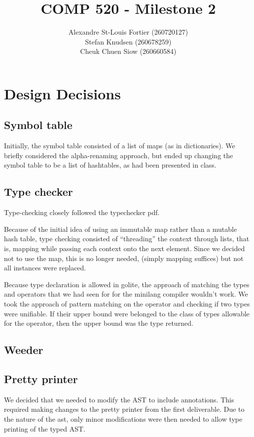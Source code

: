 \documentclass{article}
\begin{document}
\pagestyle{empty}

\title{COMP 520 - Milestone 2}
\author{
Alexandre St-Louis Fortier (260720127)\\
Stefan Knudsen (260678259)\\
Cheuk Chuen Siow (260660584)}
\maketitle

\raggedright
\section*{Design Decisions}
\subsection*{Symbol table}
Initially, the symbol table consisted of a list of maps (as in dictionaries). We briefly considered the alpha-renaming approach, but ended up changing the symbol table to be a list of hashtables, as had been presented in class.

\subsection*{Type checker}
Type-checking closely followed the typechecker pdf.

Because of the initial idea of using an immutable map rather than a mutable hash table, type checking consisted of ``threading'' the context through lists, that is, mapping while passing each context onto the next element. Since we decided not to use the map, this is no longer needed, (simply mapping suffices) but not all instances were replaced.

Because type declaration is allowed in golite, the approach of matching the types and operators that we had seen for for the minilang compiler wouldn't work. We took the approach of pattern matching on the operator and checking if two types were unifiable. If their upper bound were belonged to the class of types allowable for the operator, then the upper bound was the type returned.


\subsection*{Weeder}

\subsection*{Pretty printer}
We decided that we needed to modify the AST to include annotations. This required making changes to the pretty printer from the first deliverable. Due to the nature of the ast, only minor modifications were then needed to allow type printing of the typed AST.
\end{document}
